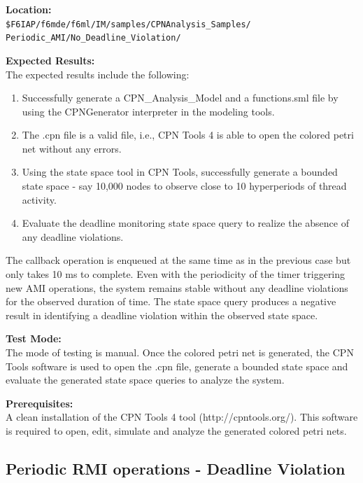 \noindent\textbf{Location:}\\
\texttt{\$F6IAP/f6mde/f6ml/IM/samples/CPNAnalysis\_Samples/ \\ Periodic\_AMI/No\_Deadline\_Violation/}


\noindent\textbf{Expected Results:}\\

The expected results include the following: 
\begin{enumerate}
\item Successfully generate a CPN\_Analysis\_Model and a functions.sml file by using the CPNGenerator interpreter in the modeling tools.
\item The .cpn file is a valid file, i.e., CPN Tools 4 is able to open the colored petri net without any errors.
\item Using the state space tool in CPN Tools, successfully generate a bounded state space - say 10,000 nodes to observe close to 10 hyperperiods of thread activity.
\item Evaluate the deadline monitoring state space query to realize the absence of any deadline violations.
\end{enumerate}

The callback operation is enqueued at the same time as in the previous case but only takes 10 ms to complete. Even with the periodicity of the timer triggering new AMI operations, the system remains stable without any deadline violations for the observed duration of time. The state space query produces a negative result in identifying a deadline violation within the observed state space. 

\noindent\textbf{Test Mode:}\\
The mode of testing is manual. Once the colored petri net is generated, the CPN Tools software is used to open the .cpn file, generate a bounded state space and evaluate the generated state space queries to analyze the system.

\noindent\textbf{Prerequisites:}\\
A clean installation of the CPN Tools 4 tool (http://cpntools.org/). This software is required to open, edit, simulate and analyze the generated colored petri nets. 

\subsection{Periodic RMI operations - Deadline Violation}
\label{sec:RMI}

